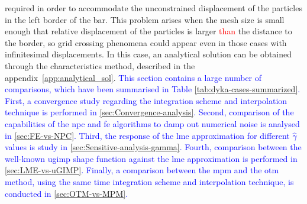 \documentclass[preprint,12pt,a4paper]{elsarticle}
\begin{document}
required in order to accommodate the unconstrained displacement of the
particles in the left border of the bar. This problem arises
when the mesh size is small enough that relative displacement of the particles is larger \textcolor{red}{than} the distance to the border, so grid crossing phenomena could appear even in those cases with infinitesimal displacements. In this case, an analytical solution can be obtained through the characteristics method, described in the appendix~\ref{app:analytical_sol}. \textcolor{blue}{This section contains a large number of comparisons, which have been summarised in Table \ref{tab:dyka-cases-summarized}. First, a convergence study regarding the integration scheme and interpolation technique is performed in  \ref{sec:Convergence-analysis}. Second, comparison of the capabilities of the \acrshort{npc} and \acrshort{fe} algorithms to damp out numerical noise is analysed in \ref{sec:FE-vs-NPC}. Third, the response of the \acrshort{lme} approximation for different $\widehat{\gamma}$ values is study in  \ref{sec:Sensitive-analysis-gamma}. Fourth, comparison between the well-known \acrshort{ugimp} shape function against the \acrshort{lme} approximation is performed in \ref{sec:LME-vs-uGIMP}. Finally, a comparison between the \acrshort{mpm} and the \acrfull{otm} method, using the same time integration scheme and interpolation technique, is conducted in \ref{sec:OTM-vs-MPM}.}
\end{document}
